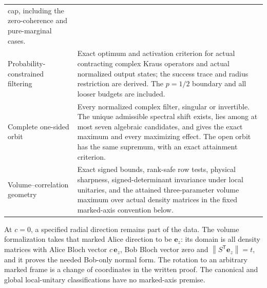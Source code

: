 \documentclass[11pt,a4paper]{article}
\theoremstyle{remark}\newtheorem{remark}[theorem]{Remark}
\newcommand{\norm}[1]{\left\lVert#1\right\rVert}
\begin{document}
\begin{longtable}{>{\raggedright\arraybackslash}p{.32\linewidth}p{.61\linewidth}}
cap, including the zero-coherence and pure-marginal cases.\\
Probability-constrained filtering & Exact optimum and activation criterion
for actual contracting complex Kraus operators and actual normalized output
states; the success trace and radius restriction are derived. The
$p=1/2$ boundary and all looser budgets are included.\\
Complete one-sided orbit & Every normalized complex filter, singular or
invertible. The unique admissible spectral shift exists, lies among at most
seven algebraic candidates, and gives the exact maximum and every
maximizing effect. The open orbit has the same supremum, with an exact
attainment criterion.\\
Volume--correlation geometry & Exact signed bounds, rank-safe row tests,
physical sharpness, signed-determinant invariance under local unitaries,
and the attained three-parameter volume maximum over actual density
matrices in the fixed marked-axis convention below.\\
\bottomrule
\end{longtable}

At $c=0$, a specified radial direction remains part of the data. The
volume formalization takes that marked Alice direction to be $\mathbf e_z$:
its domain is all density matrices with Alice Bloch vector $c\,\mathbf e_z$,
Bob Bloch vector zero and $\norm{S^{\mathsf T}\mathbf e_z}=t$, and it
proves the needed Bob-only normal form. The rotation to an arbitrary
marked frame is a change of coordinates in the written proof. The
canonical and global local-unitary classifications have no marked-axis
premise.
\end{document}
